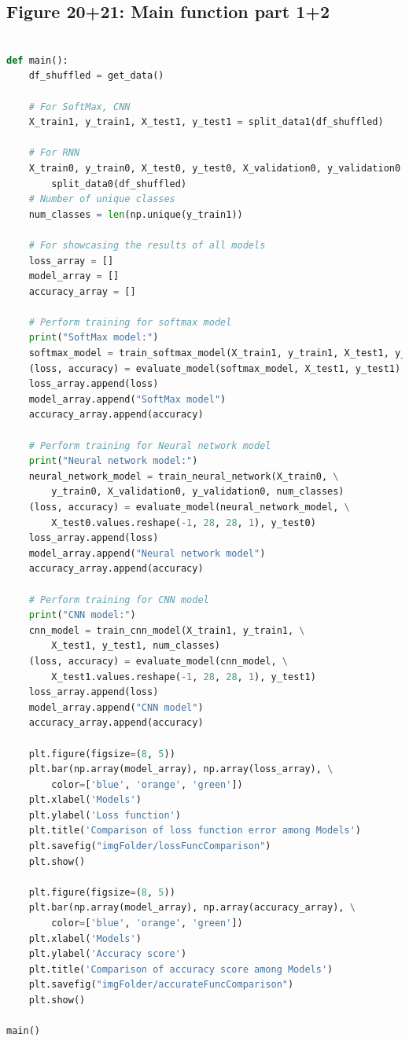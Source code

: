 \documentclass{article}
\begin{document}
\subsection{Figure 20+21: Main function part 1+2}
\begin{lstlisting}[language=Python]

def main():
    df_shuffled = get_data()

    # For SoftMax, CNN
    X_train1, y_train1, X_test1, y_test1 = split_data1(df_shuffled)

    # For RNN
    X_train0, y_train0, X_test0, y_test0, X_validation0, y_validation0 = \
        split_data0(df_shuffled)
    # Number of unique classes
    num_classes = len(np.unique(y_train1))

    # For showcasing the results of all models
    loss_array = []
    model_array = []
    accuracy_array = []

    # Perform training for softmax model
    print("SoftMax model:")
    softmax_model = train_softmax_model(X_train1, y_train1, X_test1, y_test1, num_classes)
    (loss, accuracy) = evaluate_model(softmax_model, X_test1, y_test1)
    loss_array.append(loss)
    model_array.append("SoftMax model")
    accuracy_array.append(accuracy)
    
    # Perform training for Neural network model
    print("Neural network model:")
    neural_network_model = train_neural_network(X_train0, \
        y_train0, X_validation0, y_validation0, num_classes)
    (loss, accuracy) = evaluate_model(neural_network_model, \
        X_test0.values.reshape(-1, 28, 28, 1), y_test0)
    loss_array.append(loss)
    model_array.append("Neural network model")
    accuracy_array.append(accuracy)
            
    # Perform training for CNN model
    print("CNN model:")
    cnn_model = train_cnn_model(X_train1, y_train1, \
        X_test1, y_test1, num_classes)
    (loss, accuracy) = evaluate_model(cnn_model, \
        X_test1.values.reshape(-1, 28, 28, 1), y_test1)
    loss_array.append(loss)
    model_array.append("CNN model")
    accuracy_array.append(accuracy)
    
    plt.figure(figsize=(8, 5))
    plt.bar(np.array(model_array), np.array(loss_array), \
        color=['blue', 'orange', 'green'])
    plt.xlabel('Models')
    plt.ylabel('Loss function')
    plt.title('Comparison of loss function error among Models')
    plt.savefig("imgFolder/lossFuncComparison")
    plt.show()
    
    plt.figure(figsize=(8, 5))
    plt.bar(np.array(model_array), np.array(accuracy_array), \
        color=['blue', 'orange', 'green'])
    plt.xlabel('Models')
    plt.ylabel('Accuracy score')
    plt.title('Comparison of accuracy score among Models')
    plt.savefig("imgFolder/accurateFuncComparison")
    plt.show()

main()

\end{lstlisting}
\end{document}
